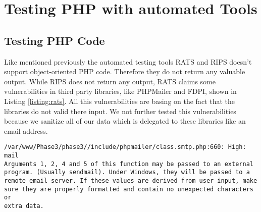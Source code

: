 \chapter{Testing PHP with automated Tools}

\section{Testing PHP Code}
Like mentioned previously the automated testing tools RATS and RIPS doesn't support object-oriented PHP code. Therefore they do not return any valuable output.
While RIPS does not return any output, RATS claims some vulnerabilities in third party libraries, like PHPMailer and FDPI, shown in Listing \ref{listing:rats}.
All this vulnerabilities are basing on the fact that the libraries do not valid there input. 
We not further tested this vulnerabilities because we sanitize all of our data which is delegated to these libraries like an email address.

\begin{lstlisting}[caption = Output of tool RATS claiming vulnerabilities of PHPMailer library,label = listing:rats]
/var/www/Phase3/phase3//include/phpmailer/class.smtp.php:660: High: mail
Arguments 1, 2, 4 and 5 of this function may be passed to an external 
program. (Usually sendmail). Under Windows, they will be passed to a
remote email server. If these values are derived from user input, make
sure they are properly formatted and contain no unexpected characters or
extra data.
\end{lstlisting}

  
